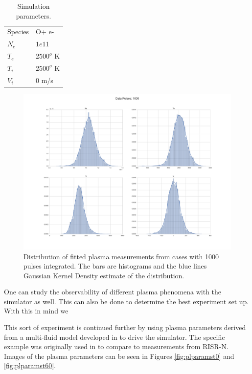 \documentclass[draft,ras]{agutex}
\begin{document}
\begin{article}
\begin{table}[!t]
\centering
\caption{Simulation parameters.}
\label{tb:param1}
\begin{tabular}{ll}
Species & O+ e-\\
$N_e$    & $1e11$ \\
$T_e$      & $2500^o$ K   \\
$T_i$      & $2500^o$ K \\
$V_i$      & $0$ m/s
\end{tabular}
\end{table}

\begin{figure}[!t]
\centering
\includegraphics[width=5in]{Data01000pulses}
\caption{Distribution of fitted plasma measurements from cases with 1000 pulses integrated. The bars are histograms and the blue lines Gaussian Kernel Density estimate of the distribution.}
\label{fig:statsdata}
\end{figure}

One can study the observability  of different plasma phenomena with the simulator as well. This can also be done to determine the best experiment set up. With this in mind we 



This sort of experiment is continued further by using plasma parameters derived from a multi-fluid model developed in \cite{semeter:plasmatransport2012} to drive the simulator. The specific example was originally used in \cite{Perry:2015jf} to compare to measurements from RISR-N. Images of the plasma parameters can be seen in Figures \ref{fig:plparamst0} and \ref{fig:plparamst60}.


\end{article}
\end{document}
